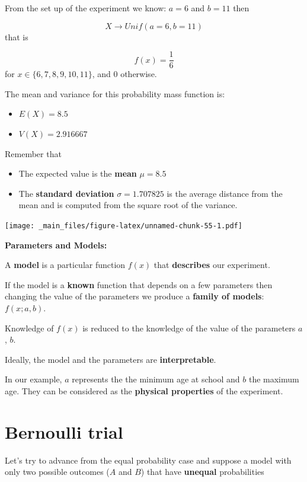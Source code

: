 \documentclass[
]{book}
\providecommand{\tightlist}{%
  \setlength{\itemsep}{0pt}\setlength{\parskip}{0pt}}
\begin{document}
From the set up of the experiment we know: \(a=6\) and \(b=11\) then

\[X \rightarrow Unif(a=6, b=11)\] that is

\[f(x)=\frac{1}{6}\] for \(x\in \{6,7,8,9,10,11\}\), and \(0\) otherwise.

The mean and variance for this probability mass function is:

\begin{itemize}
\tightlist
\item
  \(E(X)=8.5\)
\item
  \(V(X)=2.916667\)
\end{itemize}

Remember that

\begin{itemize}
\item
  The expected value is the \textbf{mean} \(\mu=8.5\)
\item
  The \textbf{standard deviation} \(\sigma=1.707825\) is the average distance from the mean and is computed from the square root of the variance.
\end{itemize}

\texttt{[image: \_main\_files/figure-latex/unnamed-chunk-55-1.pdf]}

\textbf{Parameters and Models:}

A \textbf{model} is a particular function \(f(x)\) that \textbf{describes} our experiment.

If the model is a \textbf{known} function that depends on a few parameters then changing the value of the parameters we produce a \textbf{family of models}: \(f(x; a,b)\).

Knowledge of \(f(x)\) is reduced to the knowledge of the value of the parameters \(a\), \(b\).

Ideally, the model and the parameters are \textbf{interpretable}.

In our example, \(a\) represents the the minimum age at school and \(b\) the maximum age. They can be considered as the \textbf{physical properties} of the experiment.

\hypertarget{bernoulli-trial}{%
\section{Bernoulli trial}\label{bernoulli-trial}}

Let's try to advance from the equal probability case and suppose a model with only two possible outcomes (\(A\) and \(B\)) that have \textbf{unequal} probabilities
\end{document}
